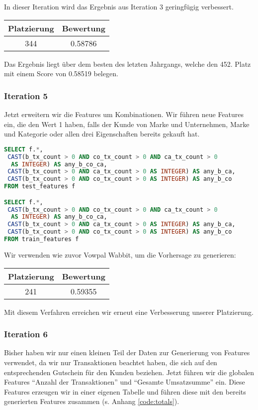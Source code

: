 In dieser Iteration wird das Ergebnis aus Iteration 3 geringfügig verbessert.

\begin{tabular}{|c|c|}
	\hline \textbf{Platzierung} & \textbf{Bewertung} \\ 
	\hline 344 & 0.58786  \\ 
	\hline 
\end{tabular}

Das Ergebnis liegt über dem besten des letzten Jahrgangs, welche den 452. Platz mit einem Score von 0.58519 belegen.

\subsubsection{Iteration 5}

Jetzt erweitern wir die Features um Kombinationen. Wir führen neue Features ein, die den Wert 1 haben,
falls der Kunde von Marke und Unternehmen, Marke und Kategorie oder allen drei Eigenschaften bereits
gekauft hat.

\begin{lstlisting}[language=SQL]
SELECT f.*, 
 CAST(b_tx_count > 0 AND co_tx_count > 0 AND ca_tx_count > 0 
  AS INTEGER) AS any_b_co_ca,
 CAST(b_tx_count > 0 AND ca_tx_count > 0 AS INTEGER) AS any_b_ca,
 CAST(b_tx_count > 0 AND co_tx_count > 0 AS INTEGER) AS any_b_co
FROM test_features f

SELECT f.*, 
 CAST(b_tx_count > 0 AND co_tx_count > 0 AND ca_tx_count > 0 
  AS INTEGER) AS any_b_co_ca,
 CAST(b_tx_count > 0 AND ca_tx_count > 0 AS INTEGER) AS any_b_ca,
 CAST(b_tx_count > 0 AND co_tx_count > 0 AS INTEGER) AS any_b_co
FROM train_features f
\end{lstlisting}

Wir verwenden wie zuvor Vowpal Wabbit, um die Vorhersage zu generieren:

\begin{tabular}{|c|c|}
	\hline \textbf{Platzierung} & \textbf{Bewertung} \\ 
	\hline 241 & 0.59355  \\ 
	\hline 
\end{tabular}

Mit diesem Verfahren erreichen wir erneut eine Verbesserung unserer Platzierung.

\subsubsection{Iteration 6}
Bisher haben wir nur einen kleinen Teil der Daten zur Generierung von Features verwendet,
da wir nur Transaktionen beachtet haben, die sich auf den entsprechenden Gutschein für 
den Kunden beziehen. 
Jetzt führen wir die globalen Features "`Anzahl der Transaktionen"' und "`Gesamte Umsatzsumme"' ein. Diese Features erzeugen wir in einer eigenen Tabelle und führen diese mit den bereits generierten Features zusammen (s. Anhang \ref{code:totals}).

